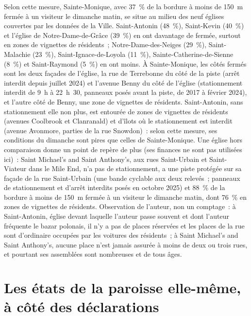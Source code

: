\documentclass[11pt,letterpaper]{article}
\begin{document}
Selon cette mesure, Sainte-Monique, avec 37~\% de la bordure à moins de 150~m fermée à un visiteur le dimanche matin, se situe au milieu des neuf églises couvertes par les données de la Ville. Saint-Antonin (48~\%), Saint-Kevin (40~\%) et l'église de Notre-Dame-de-Grâce (39~\%) en ont davantage de fermée, surtout en zones de vignettes de résidents~; Notre-Dame-des-Neiges (29~\%), Saint-Malachie (23~\%), Saint-Ignace-de-Loyola (11~\%), Sainte-Catherine-de-Sienne (8~\%) et Saint-Raymond (5~\%) en ont moins. À Sainte-Monique, les côtés fermés sont les deux façades de l'église, la rue de Terrebonne du côté de la piste (arrêt interdit depuis juillet 2024) et l'avenue Benny du côté de l'église (stationnement interdit de 9~h à 22~h~30, panneaux posés avant la piste, de 2017 à février 2024), et l'autre côté de Benny, une zone de vignettes de résidents. Saint-Antonin, sans stationnement elle non plus, est entourée de zones de vignettes de résidents (avenues Coolbrook et Clanranald) et d'îlots où le stationnement est interdit (avenue Avonmore, parties de la rue Snowdon)~: selon cette mesure, ses conditions du dimanche sont pires que celles de Sainte-Monique. Une église hors comparaison donne un point de repère de plus (ses finances ne sont pas utilisées ici)~: Saint Michael's and Saint Anthony's, aux rues Saint-Urbain et Saint-Viateur dans le Mile End, n'a pas de stationnement, a une piste protégée sur sa façade de la rue Saint-Urbain (une bande cyclable aux deux relevés~; panneaux de stationnement et d'arrêt interdits posés en octobre 2025) et 88~\% de la bordure à moins de 150~m fermée à un visiteur le dimanche matin, dont 76~\% en zones de vignettes de résidents. Observation de l'auteur, non un comptage~: à Saint-Antonin, église devant laquelle l'auteur passe souvent et dont l'auteur fréquente le bazar polonais, il n'y a pas de places réservées et les places de la rue sont d'ordinaire occupées par les voitures des résidents~; à Saint Michael's and Saint Anthony's, aucune place n'est jamais assurée à moins de deux ou trois rues, et pourtant ses assemblées sont nombreuses et de tous âges.

\section{Les états de la paroisse elle-même, à côté des déclarations}\label{sec:statements}
\end{document}
